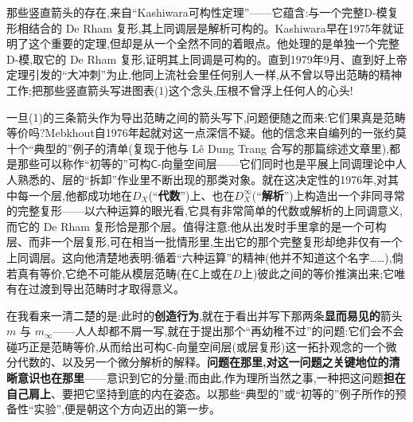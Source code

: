 \noindent 那些竖直箭头的存在,来自“Kashiwara可构性定理”——它蕴含:与一个完整D-模复形相结合的 De Rham 复形,其上同调层是解析可构的。Kashiwara早在1975年就证明了这个重要的定理,但却是从一个全然不同的着眼点。他处理的是单独一个完整D-模,取它的 De Rham 复形,证明其上同调是可构的。直到1979年9月、直到好上帝定理引发的“大冲刺”为止,他同上流社会里任何别人一样,从不曾以导出范畴的精神工作;把那些竖直箭头写进图表(1)这个念头,压根不曾浮上任何人的心头!

\noindent 一旦(1)的三条箭头作为导出范畴之间的箭头写下,问题便随之而来:它们果真是范畴等价吗?Mebkhout自1976年起就对这一点深信不疑。他的信念来自\dmark{}编列的一张约莫十个“典型的”例子的清单(复现于他与 Lê Dung Trang 合写的那篇综述文章里),都是那些可以称作“初等的”可构$\mathsf{C}$-向量空间层——它们同时也是平展上同调理论中人人熟悉的、层的“拆卸”作业里不断出现的那类对象。就在这决定性的1976年,对其中每一个层,他都成功地在$D_{X}$(“\textbf{代数}”)上、也在$D^{\infty}_{X}$(“\textbf{解析}”)上构造出一个非同寻常的完整复形——以六种运算的眼光看,它具有非常简单的代数或解析的上同调意义,而它的 De Rham 复形恰是那个层。值得注意:他从出发时手里拿的是一个可构层、而非一个层复形,可在相当一批情形里,生出它的那个完整复形却绝非仅有一个上同调层。这向他清楚地表明:循着“六种运算”的精神(他并不知道这个名字……),倘若真有等价,它绝不可能从模层范畴(在$\mathsf{C}$上或在$D$上)彼此之间的等价推演出来;它唯有在过渡到导出范畴时才取得意义。

\noindent 在我看来一清二楚的是:此时的\textbf{创造行为},就在于看出并写下那两条\textbf{显而易见的}箭头 $m$ 与 $m_{\infty}$——人人却都不屑一写,就在于提出那个“再幼稚不过”的问题:它们会不会碰巧正是范畴等价,从而给出可构$\mathsf{C}$-向量空间层(或层复形)这一拓扑观念的一个微分代数的、以及另一个微分解析的解释。\textbf{问题在那里,对这一问题之关键地位的清晰意识也在那里}——意识到它的分量;而由此,作为理所当然之事,一种把这问题\textbf{担在自己肩上}、要把它坚持到底的内在姿态。以那些“典型的”或“初等的”例子所作的预备性“实验”,便是朝这个方向迈出的第一步。

